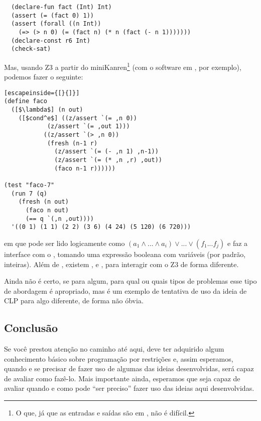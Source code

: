 \documentclass{article}
\begin{document}
\begin{lstlisting}
  (declare-fun fact (Int) Int)
  (assert (= (fact 0) 1))
  (assert (forall ((n Int))
    (=> (> n 0) (= (fact n) (* n (fact (- n 1)))))))
  (declare-const r6 Int)
  (check-sat)
\end{lstlisting}

Mas, usando Z3 a partir do miniKanren\footnote{O que, já que as
  entradas e saídas são em , não é difícil.} (com o
software em \cite{namin}, por exemplo), podemos fazer o seguinte:

\begin{lstlisting}[escapeinside={[}{]}]
(define faco
  ([$\lambda$] (n out)
    ([$cond^e$] ((z/assert `(= ,n 0))
            (z/assert `(= ,out 1)))
           ((z/assert `(> ,n 0))
            (fresh (n-1 r)
              (z/assert `(= (- ,n 1) ,n-1))
              (z/assert `(= (* ,n ,r) ,out))
              (faco n-1 r))))))

(test "faco-7"
  (run 7 (q)
    (fresh (n out)
      (faco n out)
      (== q `(,n ,out))))
  '((0 1) (1 1) (2 2) (3 6) (4 24) (5 120) (6 720)))

\end{lstlisting}

\noindent em que  pode ser lido logicamente como $(a_1 \wedge ... \wedge a_i) \vee
... \vee (f_1 ... f_j)$ e  faz a interface com o
, tomando uma expressão booleana com variáveis (por
padrão, inteiras). Além de , existem ,
 e , para interagir com o Z3 de forma
diferente.

Ainda não é certo, se para algum, para qual ou quais tipos de
problemas esse tipo de abordagem é apropriado, mas é um exemplo de
tentativa de uso da ideia de CLP para algo diferente, de forma não
óbvia.
           
\subsection{Conclusão}



Se você prestou atenção no caminho até aqui, deve ter adquirido algum
conhecimento básico sobre programação por restrições e, assim
esperamos, quando e se precisar de fazer uso de algumas das ideias
desenvolvidas, será capaz de avaliar como fazê-lo. Mais importante
ainda, esperamos que seja capaz de avaliar quando e como pode ``ser
preciso'' fazer uso das ideias aqui desenvolvidas.
\end{document}

